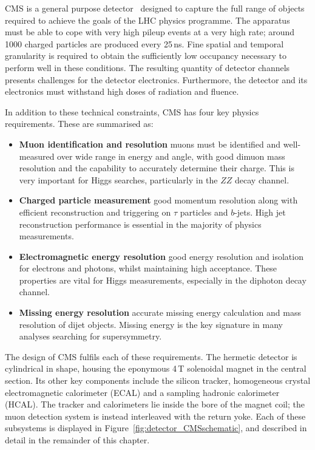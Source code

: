 CMS is a general purpose detector~\cite{CMSdetector} designed to capture the full range of objects required to achieve the goals of the LHC physics programme.
The apparatus must be able to cope with very high pileup events at a very high rate; around 1000 charged particles are produced every 25\,ns.
Fine spatial and temporal granularity is required to obtain the sufficiently low occupancy necessary to perform well in these conditions.
The resulting quantity of detector channels presents challenges for the detector electronics.
Furthermore, the detector and its electronics must withstand high doses of radiation and fluence.

In addition to these technical constraints, CMS has four key physics requirements.
These are summarised as:
\begin{itemize}
  \item{\textbf{Muon identification and resolution} 
  muons must be identified and well-measured over wide range in energy and angle, 
  with good dimuon mass resolution and the capability to accurately determine their charge.
  This is very important for Higgs searches, particularly in the $ZZ$ decay channel.}
  \item{\textbf{Charged particle measurement}
  good momentum resolution along with efficient reconstruction and triggering on $\tau$ particles and $b$-jets.
  High jet reconstruction performance is essential in the majority of physics measurements.}
  \item{\textbf{Electromagnetic energy resolution}
  good energy resolution and isolation for electrons and photons, whilst maintaining high acceptance.
  These properties are vital for Higgs measurements, especially in the diphoton decay channel.}
  \item{\textbf{Missing energy resolution}
  accurate missing energy calculation and mass resolution of dijet objects.
  Missing energy is the key signature in many analyses searching for supersymmetry.}
\end{itemize}

The design of CMS fulfils each of these requirements.
The hermetic detector is cylindrical in shape, housing the eponymous 4\,T solenoidal magnet in the central section.
Its other key components include the silicon tracker, homogeneous crystal electromagnetic calorimeter (ECAL) and a sampling hadronic calorimeter (HCAL).
The tracker and calorimeters lie inside the bore of the magnet coil; the muon detection system is instead interleaved with the return yoke.
Each of these subsystems is displayed in Figure~\ref{fig:detector_CMSschematic}, and described in detail in the remainder of this chapter.

